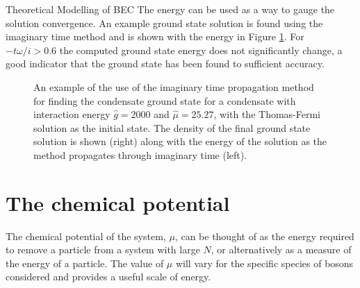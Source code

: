 \begin{chapter}{\label{cha:theoretical_model}Theoretical Modelling of BEC}
The energy can be used as a way to gauge the solution convergence. An example ground state solution is found using the imaginary time method and is shown with the energy in Figure \ref{fig_imagtimesolgs}. For $-t\omega/i > 0.6$ the computed ground state energy does not significantly change, a good indicator that the ground state has been found to sufficient accuracy.
\begin{figure}[!ht]
	\centering
  \hspace{0.04\linewidth}
	\caption{An example of the use of the imaginary time propagation method for finding the condensate ground state for a condensate with interaction energy $\hat{g}=2000$ and $\hat{\mu}=25.27$, with the Thomas-Fermi solution as the initial state. The density of the final ground state solution is shown (right) along with the energy of the solution as the method propagates through imaginary time (left).}\label{fig_imagtimesolgs}
\end{figure}

\section{\label{section:mu} The chemical potential}
The chemical potential of the system, $\mu$, can be thought of as the energy required to remove a particle from a system with large $N$, or alternatively as a measure of the energy of a particle. The value of $\mu$ will vary for the specific species of bosons considered and provides a useful scale of energy.


\end{chapter}
